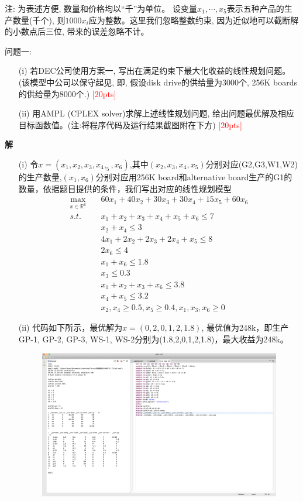 \documentclass[10pt]{article}
\begin{document}
注: 为表述方便, 数量和价格均以``千''为单位。 设变量$x_1, \cdots, x_5$表示五种产品的生产数量(千个), 则$1000 x_i$应为整数。这里我们忽略整数约束, 因为近似地可以截断解的小数点后三位, 带来的误差忽略不计。

{\color{blue}问题一: 
	\begin{itemize}
		\item[(i)] 若DEC公司使用方案一, 写出在满足约束下最大化收益的线性规划问题。(该模型中公司以保守起见, 即, 假设disk drive的供给量为3000个, 256K boards的供给量为8000个.) \textcolor{red}{[20pts]}
		\item[(ii)] 用AMPL (CPLEX solver)求解上述线性规划问题, 给出问题最优解及相应目标函数值。(注:将程序代码及运行结果截图附在下方) \textcolor{red}{[20pts]}
	\end{itemize}
	 }
\textbf{解}
\begin{itemize}
	\item[(i)] 令$x=(x_1,x_2,x_3,x_4,_5,x_6)$,其中$(x_2,x_3,x_4,x_5)$分别对应(G2,G3,W1,W2)的生产数量,$(x_1,x_6)$分别对应用256K board和alternative board生产的G1的数量，依据题目提供的条件，我们写出对应的线性规划模型
	\begin{equation}
		\begin{aligned}
			\max_{x\in \mathbb{R}^6}\quad &60x_1+ 40x_2+30x_3+30x_4+15x_5+60x_6\\
			s.t. \quad &x_1+x_2+x_3+x_4+x_5+x_6\le 7\\
			\quad &x_2+x_4\le 3\\
			\quad &4x_1+2x_2+2x_3+2x_4+x_5\le 8\\
			\quad &2x_6\le 4\\
			\quad &x_1+x_6\le 1.8\\
			\quad &x_3\le 0.3\\
			\quad &x_1+x_2+x_3+x_6 \le 3.8\\
			\quad &x_4+x_5\le 3.2\\
			\quad &x_2,x_4\ge 0.5,x_5\ge 0.4,x_1,x_3,x_6\ge 0
		\end{aligned}
	\end{equation}
	\item[(ii)]代码如下所示，最优解为$x = (0,2,0,1,2,1.8)$, 最优值为248k，即生产GP-1, GP-2, GP-3, WS-1, WS-2分别为(1.8,2,0,1,2,1.8)，最大收益为248k。
	\begin{figure}[H]
	\centering
	\includegraphics[width=0.8\linewidth]{p1.png}
	\label{fig.prob2}
	\end{figure}
\end{itemize}
\end{document}

